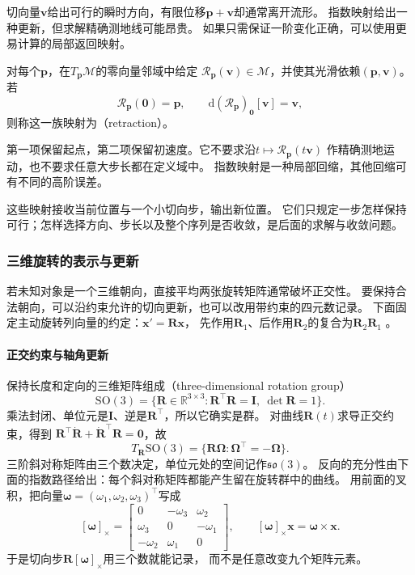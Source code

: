 切向量$\bm v$给出可行的瞬时方向，有限位移$\bm p+\bm v$却通常离开流形。
指数映射给出一种更新，但求解精确测地线可能昂贵。
如果只需保证一阶变化正确，可以使用更易计算的局部返回映射。

\begin{definition}[回缩]
\label{def:geometry-retraction}
对每个$\bm p$，在$T_{\bm p}\mathcal M$的零向量邻域中给定
$\mathcal R_{\bm p}(\bm v)\in\mathcal M$，并使其光滑依赖$(\bm p,\bm v)$。
若
\[
 \mathcal R_{\bm p}(\bm0)=\bm p,\qquad
 \mathrm d(\mathcal R_{\bm p})_{\bm0}[\bm v]=\bm v,
\]
则称这一族映射为（retraction）。
\end{definition}
第一项保留起点，第二项保留初速度。它不要求沿$t\mapsto\mathcal R_{\bm p}(t\bm v)$
作精确测地运动，也不要求任意大步长都在定义域中。
指数映射是一种局部回缩，其他回缩可有不同的高阶误差。


这些映射接收当前位置与一个小切向步，输出新位置。
它们只规定一步怎样保持可行；怎样选择方向、步长以及整个序列是否收敛，是后面的求解与收敛问题。

\subsubsection{三维旋转的表示与更新}
\label{sec:geometry-so3-updates}

若未知对象是一个三维朝向，直接平均两张旋转矩阵通常破坏正交性。
要保持合法朝向，可以沿约束允许的切向更新，也可以改用带约束的四元数记录。
下面固定主动旋转列向量的约定：$\bm x'=\bm R\bm x$，
先作用$\bm R_1$、后作用$\bm R_2$的复合为$\bm R_2\bm R_1$
。

\paragraph{正交约束与轴角更新}
保持长度和定向的三维矩阵组成（three-dimensional rotation group）
\[
 \mathrm{SO}(3)=\{\bm R\in\mathbb R^{3\times3}:\bm R^\top\bm R=\bm I,
 \ \det\bm R=1\}.
\]
乘法封闭、单位元是$\bm I$、逆是$\bm R^\top$，所以它确实是群。
对曲线$\bm R(t)$求导正交约束，得到
$\bm R^\top\dot{\bm R}+\dot{\bm R}^\top\bm R=\bm0$，故
\[
 T_{\bm R}\mathrm{SO}(3)=\{\bm R\bm\Omega:\bm\Omega^\top=-\bm\Omega\}.
\]
三阶斜对称矩阵由三个数决定，单位元处的空间记作$\mathfrak{so}(3)$。
反向的充分性由下面的指数路径给出：每个斜对称矩阵都能产生留在旋转群中的曲线。
用前面的叉积，把向量$\bm\omega=(\omega_1,\omega_2,\omega_3)^\top$写成
\[
 [\bm\omega]_\times=
 \begin{bmatrix}0&-\omega_3&\omega_2\\\omega_3&0&-\omega_1\\-\omega_2&\omega_1&0\end{bmatrix},
 \qquad [\bm\omega]_\times\bm x=\bm\omega\times\bm x.
\]
于是切向步$\bm R[\bm\omega]_\times$用三个数就能记录，
而不是任意改变九个矩阵元素。

